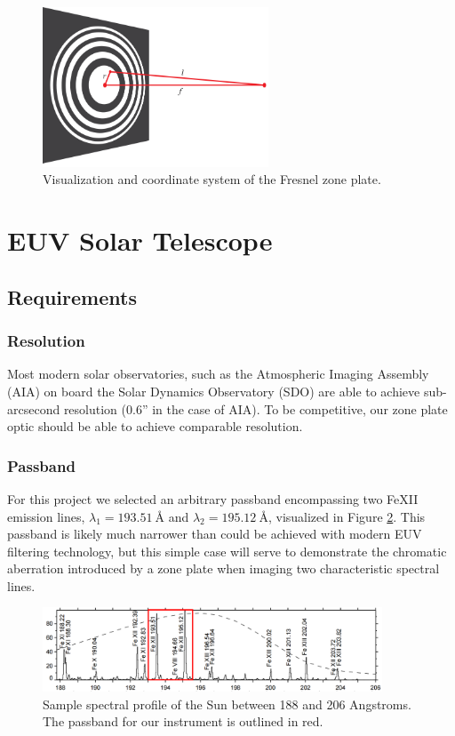 \documentclass[10pt,letterpaper]{article}
\begin{document}
		\begin{figure}[h!]
			\centering
			\includegraphics[width=0.6\textwidth]{figures/zone_plate}
			\caption{Visualization and coordinate system of the Fresnel zone plate.}
			\label{fzp}
		\end{figure}
					
	
	\section{EUV Solar Telescope}
		\subsection{Requirements}
			\subsubsection{Resolution}
				Most modern solar observatories, such as the Atmospheric Imaging Assembly (AIA) on board the Solar Dynamics Observatory (SDO) are able to achieve sub-arcsecond resolution (0.6'' in the case of AIA). To be competitive, our zone plate optic should be able to achieve comparable resolution.
			\subsubsection{Passband}
			
				For this project we selected an arbitrary passband encompassing two FeXII emission lines, $\lambda_1 = \SI{193.51}{\angstrom}$ and $\lambda_2 = \SI{195.12}{\angstrom}$, visualized in Figure \ref{spectra}. This passband is likely much narrower than could be achieved with modern EUV filtering technology, but this simple case will serve to demonstrate the chromatic aberration introduced by a zone plate when imaging two characteristic spectral lines. 
			
				\begin{figure}[h!]
					\centering
					\includegraphics[width=0.9\textwidth]{figures/euv}
					\caption{Sample spectral profile of the Sun between 188 and 206 Angstroms. The passband for our instrument is outlined in red.}
					\label{spectra}
				\end{figure}
				
\end{document}

